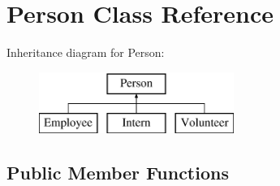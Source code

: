 \hypertarget{class_person}{\section{Person Class Reference}
\label{class_person}
}
Inheritance diagram for Person\+:\begin{figure}[H]
\begin{center}
\leavevmode
\includegraphics[height=2.000000cm]{class_person}
\end{center}
\end{figure}
\subsection*{Public Member Functions}
